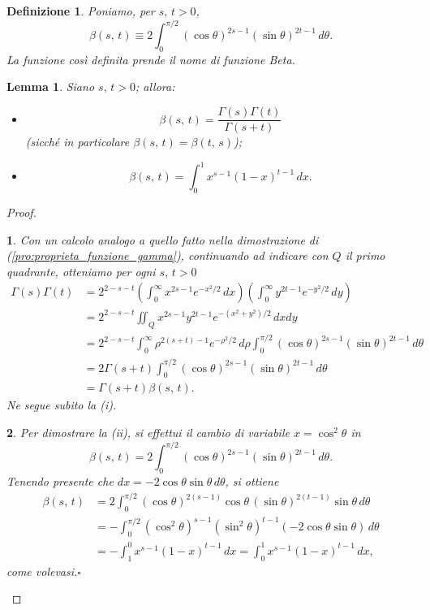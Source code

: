 \documentclass[a4paper,10pt,openright,oneside]{book}
\theoremstyle{theoremstyle}
\newtheorem{lemma}[teorema]{Lemma}
\theoremstyle{theoremstylewoheader}
\theoremstyle{theoremstyle}
\newtheorem{definizione}[teorema]{Definizione}
\theoremstyle{proofsecstyle}
\newtheorem{proofsec}{}
\theoremstyle{nonumberplain}
\newtheorem{proof}{Dim.}
\renewcommand{\qedsymbol}{\ensuremath{\square}}
\newcommand{\qed}{\unskip\nobreak\hfill\nobreak\hspace{.5em}\qedsymbol}
\begin{document}
\begin{definizione}
\label{def:funzione_beta}
Poniamo, per $s,\, t > 0$,
\[
\beta(s,\, t) \equiv 2\int_0^{\pi/2} (\cos\theta)^{2s-1} (\sin\theta)^{2t-1}\, d\theta.
\]
La funzione così definita prende il nome di \emph{funzione Beta}.
\end{definizione}

\begin{lemma}
\label{pro:proprieta_funzione_beta}
Siano $s,\, t > 0$; allora:
\begin{itemize}
\item[(i)]
\[
\beta(s,\, t) = \frac{\Gamma(s)\Gamma(t)}{\Gamma(s+t)}
\]
(sicché in particolare $\beta(s,\, t) = \beta(t,\, s)$);
\item[(ii)]
\[
\beta(s,\, t) = \int_0^1 x^{s-1} (1-x)^{t-1}\, dx.
\]
\end{itemize}
\end{lemma}
\pagebreak

\begin{proof}
\begin{proofsec}
Con un calcolo analogo a quello fatto nella dimostrazione di (\ref{pro:proprieta_funzione_gamma}), continuando ad indicare con $Q$ il primo quadrante, otteniamo per ogni $s,\, t > 0$
\begin{align*}
\Gamma(s)\Gamma(t) &= 2^{2-s-t}\left(\int_0^\infty x^{2s-1}e^{-x^2/2}\, dx\right) \left(\int_0^\infty y^{2t-1}e^{-y^2/2}\, dy\right)\\
&= 2^{2-s-t}\iint_Q  x^{2s-1} y^{2t-1} e^{-(x^2+y^2)/2}\, dxdy\\
&= 2^{2-s-t}\int_0^\infty \rho^{2(s+t)-1} e^{-\rho^2/2}\, d\rho \int_0^{\pi/2} (\cos\theta)^{2s-1} (\sin\theta)^{2t-1}\, d\theta\\
&= 2\Gamma(s+t) \int_0^{\pi/2} (\cos\theta)^{2s-1} (\sin\theta)^{2t-1}\, d\theta\\
&= \Gamma(s+t)\beta(s,\, t).
\end{align*}
Ne segue subito la (i).
\end{proofsec}

\begin{proofsec}
Per dimostrare la (ii), si effettui il cambio di variabile $x = \cos^2 \theta$ in
\[
\beta(s,\, t) = 2\int_0^{\pi/2} (\cos\theta)^{2s-1} (\sin\theta)^{2t-1}\, d\theta.
\]
Tenendo presente che $dx = -2\cos\theta \sin\theta\, d\theta$, si ottiene
\begin{align*}
\beta(s,\, t) &= 2\int_0^{\pi/2} (\cos\theta)^{2(s-1)}\cos\theta\, (\sin\theta)^{2(t-1)}\sin\theta \, d\theta\\
&= -\int_0^{\pi/2} (\cos^2\theta)^{s-1} (\sin^2\theta)^{t-1} (-2\cos\theta\sin\theta)\, d\theta\\
&= -\int_1^0 x^{s-1} (1-x)^{t-1}\, dx = \int_0^1 x^{s-1} (1-x)^{t-1}\, dx,
\end{align*}
come volevasi.\qed
\end{proofsec}
\end{proof}
\end{document}
